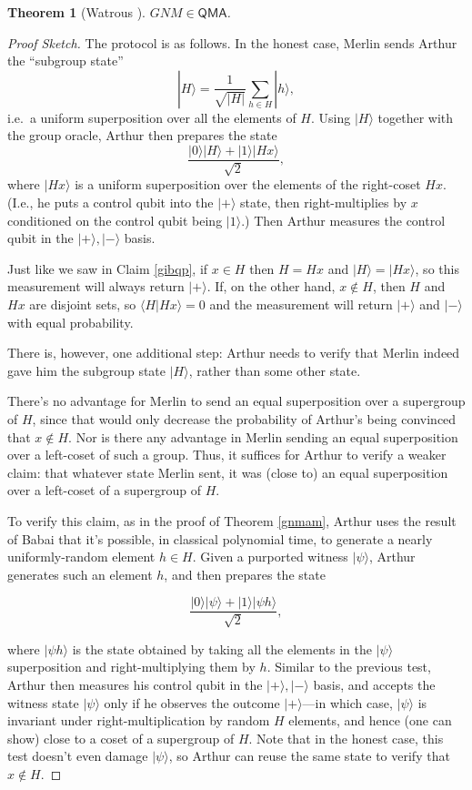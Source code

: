 \documentclass[11pt]{report}
\theoremstyle{plain}
\newtheorem{theorem}{Theorem}[section]
\theoremstyle{definition}
\renewcommand{\ket}[1]{|#1\rangle}
\newcommand{\braket}[2]{\langle#1|#2\rangle}
\begin{document}
\begin{theorem}[Watrous \cite{DBLP:conf/focs/Watrous00}]
\label{gnmqma}
$GNM \in \mathsf{QMA}$.
\end{theorem}
\begin{proof}[Proof Sketch]
The protocol is as follows.  In the honest case, Merlin sends Arthur the ``subgroup state''
\[
\ket{H} = \frac{1}{\sqrt{|H|}} \sum_{h \in H} \ket{h},
\]
i.e.\ a uniform superposition over all the elements of $H$.  Using $\ket{H}$ together with the group oracle, Arthur then prepares the state
\[
\frac{\ket0\ket{H} + \ket1\ket{Hx}}{\sqrt{2}},
\]
where $\ket{Hx}$ is a uniform superposition over the elements of the right-coset $Hx$.  (I.e., he puts a control qubit into the $\ket+$ state, then right-multiplies by $x$ conditioned on the control qubit being $\ket{1}$.)  Then Arthur measures the control qubit in the $\ket+,\ket-$ basis.

Just like we saw in Claim \ref{gibqp}, if $x\in H$ then $H=Hx$ and $\ket{H}=\ket{Hx}$, so this measurement will always return $\ket+$.  If, on the other hand, $x \notin H$, then $H$ and $Hx$ are disjoint sets, so $\braket{H}{Hx}=0$ and the measurement will return $\ket+$ and $\ket-$ with equal probability.

There is, however, one additional step: Arthur needs to verify that Merlin indeed gave him the subgroup state $\ket{H}$, rather than some other state.

There's no advantage for Merlin to send an equal superposition over a supergroup of $H$, since that would only decrease the probability of Arthur's being convinced that $x\not\in H$.  Nor is there any advantage in Merlin sending an equal superposition over a left-coset of such a group.  Thus, it suffices for Arthur to verify a weaker claim: that whatever state Merlin sent, it was (close to) an equal superposition over a left-coset of a supergroup of $H$.

To verify this claim, as in the proof of Theorem \ref{gnmam}, Arthur uses the result of Babai \cite{DBLP:conf/stoc/Babai91} that it's possible, in classical polynomial time, to generate a nearly uniformly-random element $h\in H$.  Given a purported witness $\ket{\psi}$, Arthur generates such an element $h$, and then prepares the state

\[
\frac{\ket0\ket\psi+\ket1\ket{\psi h}}{\sqrt{2}},
\]

\noindent where $\ket{\psi h}$ is the state obtained by taking all the elements in the $\ket{\psi}$ superposition and right-multiplying them by $h$.  Similar to the previous test, Arthur then measures his control qubit in the $\ket+,\ket-$ basis, and accepts the witness state $\ket{\psi}$ only if he observes the outcome $\ket+$---in which case, $\ket{\psi}$ is invariant under right-multiplication by random $H$ elements, and hence (one can show) close to a coset of a supergroup of $H$.  Note that in the honest case, this test doesn't even damage $\ket{\psi}$, so Arthur can reuse the same state to verify that $x\not\in H$.
\end{proof}
\end{document}
